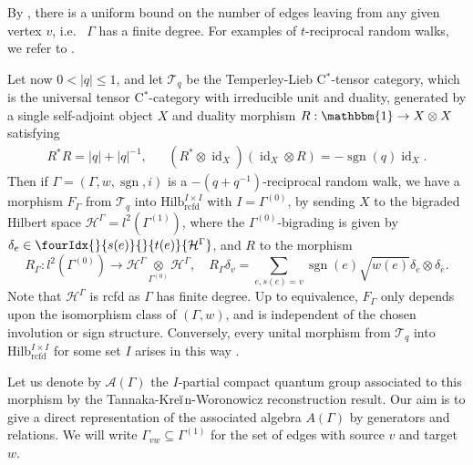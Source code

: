 \documentclass[10pt]{article}
\DeclareMathOperator{\id}{id}
\DeclareMathOperator{\rcf}{\mathrm{rcfd}}
\DeclareMathOperator{\sgn}{\mathrm{sgn}}
\newcommand{\Hsp}{\mathcal{H}}
\newcommand{\Hilbrcf}{\mathrm{Hilb}^{I\times I}_{\rcf}}
\newcommand{\Gr}[5]{\fourIdx{#2}{#4}{#3}{#5}{#1}}%
\newcommand{\Gru}[3]{\Gr{#1}{}{}{#2}{#3}}
\theoremstyle{definition}
\numberwithin{equation}{section}
\begin{document}
By \cite[Proposition 3.1]{DCY1}, there is a uniform bound on the number of edges leaving from any given vertex $v$, i.e.~ $\Gamma$ has a finite degree. For examples of $t$-reciprocal random walks, we refer to \cite{DCY1}. 

Let now $0<|q|\leq 1$, and let $\mathcal{T}_q$ be the Temperley-Lieb C$^*$-tensor category, which is the universal tensor C$^*$-category with irreducible unit and duality, generated by a single self-adjoint object $X$ and duality morphism $R: \mathbbm{1} \rightarrow  X\otimes X$ satisfying 
\begin{align*} R^*R= |q|+|q|^{-1}, &&(R^*\otimes \id_X)(\id_X\otimes R) = -\sgn(q)\id_X.\end{align*} Then if $\Gamma = (\Gamma,w,\sgn,i)$ is a $-(q+q^{-1})$-reciprocal random walk, we have a morphism $F_{\Gamma}$ from $\mathcal{T}_q$ into $\Hilbrcf$ with $I= \Gamma^{(0)}$, by sending $X$ to the bigraded Hilbert space  $\Hsp^{\Gamma}=l^2(\Gamma^{(1)})$, where the $\Gamma^{(0)}$-bigrading is given by $\delta_e \in \Gru{\Hsp^{\Gamma}}{s(e)}{t(e)}$, and $R$ to the morphism \[R_{\Gamma}:l^2(\Gamma^{(0)})\rightarrow \Hsp^{\Gamma}\underset{\Gamma^{(0)}}{\otimes} \Hsp^{\Gamma},\quad R_{\Gamma} \delta_v =\sum_{e,s(e) = v} \sgn(e)\sqrt{w(e)}\delta_e \otimes \delta_{\bar{e}}.\] Note that $\Hsp^{\Gamma}$ is rcfd as $\Gamma$ has finite degree.  Up to equivalence, $F_{\Gamma}$ only depends upon the isomorphism class of $(\Gamma,w)$, and is independent of the chosen involution or sign structure. Conversely, every unital morphism from $\mathcal{T}_q$ into $\Hilbrcf$ for some set $I$ arises in this way \cite{DCY2}.

Let us denote by $\mathscr{A}(\Gamma)$ the $I$-partial compact quantum group associated to this morphism by the Tannaka-Kre$\breve{\textrm{\i}}$n-Woronowicz reconstruction result. Our aim is to give a direct representation of the associated algebra $A(\Gamma)$ by generators and relations. We will write $\Gamma_{vw}\subseteq \Gamma^{(1)}$ for the set of edges with source $v$ and target $w$.
\end{document}
